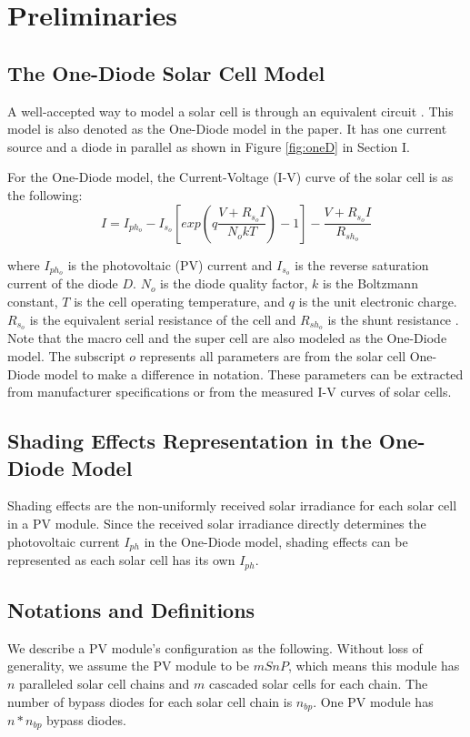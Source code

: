 \section{Preliminaries}
\subsection{The One-Diode Solar Cell Model}
A well-accepted way to model a solar cell is through an equivalent circuit \cite{oneD1}. This model is also denoted as the One-Diode model in the paper. It has one current source and a diode in parallel as shown in Figure \ref{fig:oneD} in Section I.

For the One-Diode model, the Current-Voltage (I-V) curve of the solar cell is as the following:
\begin{equation}\label{equ:oneD}
  I = I_{ph_o} - I_{s_o}[exp(q\frac{V + R_{s_o}I}{N_okT}) - 1] - \frac{V + R_{s_o}I}{R_{{sh}_o}}
\end{equation}

where $I_{ph_o}$ is the photovoltaic (PV) current and $I_{s_o}$ is the reverse saturation current of the diode $D$. $N_o$ is the diode quality factor, $k$ is the Boltzmann constant, $T$ is the cell operating temperature, and $q$ is the unit electronic charge. $R_{s_o}$ is the equivalent serial resistance of the cell and $R_{{sh}_o}$ is the shunt resistance \cite{oneD1}. Note that the macro cell and the super cell are also modeled as the One-Diode model. The subscript $o$ represents all parameters are from the solar cell One-Diode model to make a difference in notation. These parameters can be extracted from manufacturer specifications or from the measured I-V curves of solar cells.
\subsection{Shading Effects Representation in the One-Diode Model}
Shading effects are the non-uniformly received solar irradiance for each solar cell in a PV module. Since the received solar irradiance directly determines the photovoltaic current $I_{ph}$ in the One-Diode model, shading effects can be represented as each solar cell has its own $I_{ph}$.
\subsection{Notations and Definitions}
We describe a PV module's configuration as the following. Without loss of generality, we assume the PV module to be $mSnP$, which means this module has $n$ paralleled solar cell chains and $m$ cascaded solar cells for each chain. The number of bypass diodes for each solar cell chain is $n_{bp}$. One PV module has $n*n_{bp}$ bypass diodes.

